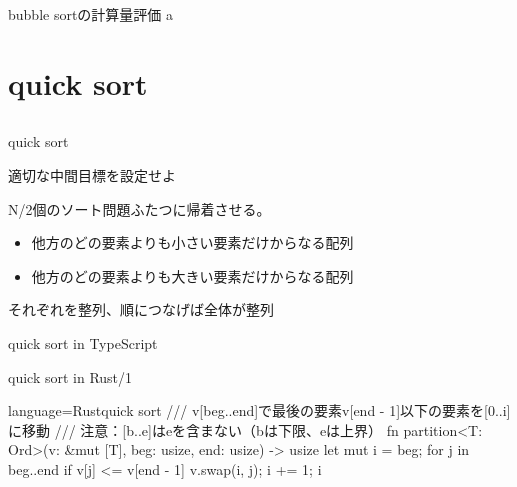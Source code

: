 \documentclass{beamer}
\begin{document}
\begin{frame}[fragile]{bubble sortの計算量評価}{}
a
\end{frame}

\section{quick sort}		%
\subsection{}

\begin{frame}[fragile]{quick sort}{}

\vfill
適切な中間目標を設定せよ

\pause
\vfill
N/2個のソート問題ふたつに帰着させる。

\begin{itemize}%
\item 他方のどの要素よりも小さい要素だけからなる配列
\item 他方のどの要素よりも大きい要素だけからなる配列
\end{itemize}
それぞれを整列、順につなげば全体が整列
\end{frame}

\begin{frame}[fragile]{quick sort in TypeScript}{}
\end{frame}

\begin{frame}[fragile]{quick sort in Rust/1}{}
\begin{codeof}{language=Rust}{quick sort}
/// v[beg..end]で最後の要素v[end - 1]以下の要素を[0..i]に移動
/// 注意：[b..e]はeを含まない（bは下限、eは上界）
fn partition<T: Ord>(v: &mut [T], beg: usize, end: usize) -> usize {
    let mut i = beg;
    for j in beg..end {
        if v[j] <= v[end - 1] {
            v.swap(i, j);
            i += 1;
        }
    }
    i
}
\end{codeof}
\end{frame}
\end{document}
